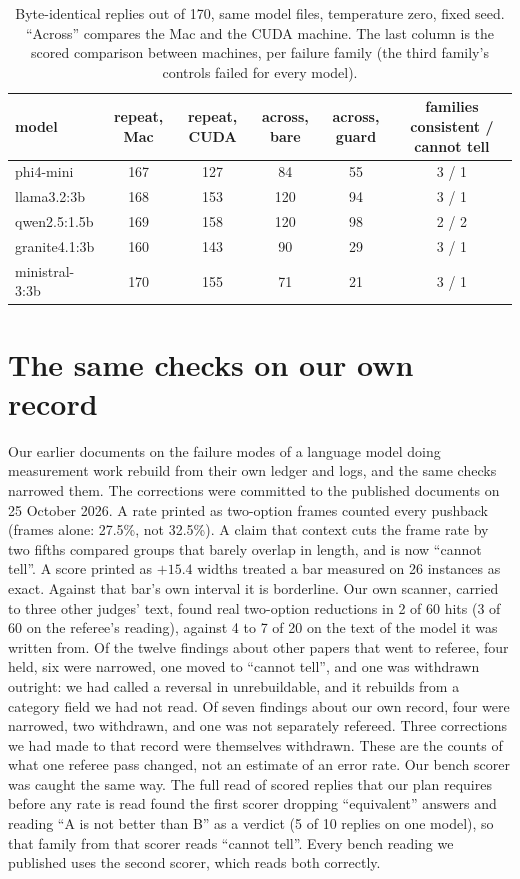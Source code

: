 \documentclass[11pt]{article}
\begin{document}
\begin{table}[h]\centering\small
\begin{tabular}{lccccc}\toprule
model & repeat, Mac & repeat, CUDA & across, bare & across, guard & families consistent / cannot tell \\\midrule
phi4-mini & 167 & 127 & 84 & 55 & 3 / 1 \\
llama3.2:3b & 168 & 153 & 120 & 94 & 3 / 1 \\
qwen2.5:1.5b & 169 & 158 & 120 & 98 & 2 / 2 \\
granite4.1:3b & 160 & 143 & 90 & 29 & 3 / 1 \\
ministral-3:3b & 170 & 155 & 71 & 21 & 3 / 1 \\\bottomrule
\end{tabular}
\caption{Byte-identical replies out of 170, same model files, temperature zero, fixed seed. ``Across'' compares the Mac and the CUDA
machine. The last column is the scored comparison between machines, per failure family (the third family's controls failed for every model).}\label{tab:seats}
\end{table}

\section{The same checks on our own record}\label{sec:self}
Our earlier documents on the failure modes of a language model doing measurement work \citep{faults,guards} rebuild from their own ledger and
logs, and the same checks narrowed them. The corrections were committed to the published documents on 25 October 2026. A rate printed as two-option frames
counted every pushback (frames alone: 27.5\%, not 32.5\%). A claim that context cuts the frame rate by two fifths compared groups that barely overlap
in length, and is now ``cannot tell''. A score printed as $+15.4$ widths treated a bar measured on 26 instances as exact. Against that bar's
own interval it is borderline. Our own scanner, carried to three other judges' text, found real two-option reductions in 2 of 60 hits (3 of 60
on the referee's reading), against 4 to 7 of 20 on the text of the model it was written from. Of the twelve findings about other papers that
went to referee, four held, six were narrowed, one moved to ``cannot tell'', and one was withdrawn outright: we had called a reversal in
\citep{r2610_18610} unrebuildable, and it rebuilds from a category field we had not read. Of seven findings about our own record, four were
narrowed, two withdrawn, and one was not separately refereed. Three corrections we had made to that record were themselves withdrawn. These
are the counts of what one referee pass changed, not an estimate of an error rate. Our bench scorer was caught the same way. The full read of scored replies that our plan requires before any rate is read found
the first scorer dropping ``equivalent'' answers and reading ``A is not better than B'' as a verdict (5 of 10 replies on one model), so that
family from that scorer reads ``cannot tell''. Every bench reading we published uses the second scorer, which reads both correctly.
\end{document}
